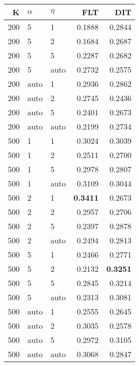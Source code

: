 \begin{table}
\begin{spacing}{1.2}
{\begin{tabular}{rll|rr}
\bottomrule
\end{tabular}
} \hfill \parbox{.45\linewidth}{\centering \begin{tabular}{rll|rr}
\toprule
   K & $\alpha$ &   $\eta$ & FLT &       DIT \\
\midrule
 200 &     5 &     1 &           0.1888 &       0.2844 \\
 200 &     5 &     2 &           0.1684 &       0.2687 \\
 200 &     5 &     5 &           0.2287 &       0.2682 \\
 200 &     5 &  auto &           0.2732 &       0.2575 \\
 200 &  auto &     1 &           0.2936 &       0.2862 \\
 200 &  auto &     2 &           0.2745 &       0.2436 \\
 200 &  auto &     5 &           0.2401 &       0.2673 \\
 200 &  auto &  auto &           0.2199 &       0.2734 \\
 500 &     1 &     1 &           0.3024 &       0.3039 \\
 500 &     1 &     2 &           0.2511 &       0.2700 \\
 500 &     1 &     5 &           0.2978 &       0.2807 \\
 500 &     1 &  auto &           0.3109 &       0.3044 \\
 500 &     2 &     1 &     {\bf 0.3411} &       0.2673 \\
 500 &     2 &     2 &           0.2957 &       0.2706 \\
 500 &     2 &     5 &           0.2397 &       0.2878 \\
 500 &     2 &  auto &           0.2494 &       0.2813 \\
 500 &     5 &     1 &           0.2466 &       0.2771 \\
 500 &     5 &     2 &           0.2132 & {\bf 0.3251} \\
 500 &     5 &     5 &           0.2845 &       0.3214 \\
 500 &     5 &  auto &           0.2313 &       0.3081 \\
 500 &  auto &     1 &           0.2555 &       0.2645 \\
 500 &  auto &     2 &           0.3035 &       0.2578 \\
 500 &  auto &     5 &           0.2972 &       0.3105 \\
 500 &  auto &  auto &           0.3068 &       0.2847 \\
\bottomrule
\end{tabular}
}
\end{spacing}
\end{table}
